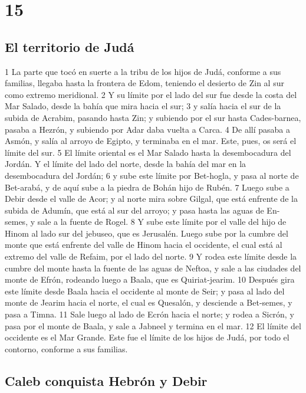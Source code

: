 \chapter{15}

\section*{El territorio de Judá}

1 La parte que tocó en suerte a la tribu de los hijos de Judá, conforme a sus familias, llegaba hasta la frontera de Edom, teniendo el desierto de Zin al sur como extremo meridional.
2 Y su límite por el lado del sur fue desde la costa del Mar Salado, desde la bahía que mira hacia el sur;
3 y salía hacia el sur de la subida de Acrabim, pasando hasta Zin; y subiendo por el sur hasta Cades-barnea, pasaba a Hezrón, y subiendo por Adar daba vuelta a Carca.
4 De allí pasaba a Asmón, y salía al arroyo de Egipto, y terminaba en el mar. Este, pues, os será el límite del sur.
5 El límite oriental es el Mar Salado hasta la desembocadura del Jordán. Y el límite del lado del norte, desde la bahía del mar en la desembocadura del Jordán;
6 y sube este límite por Bet-hogla, y pasa al norte de Bet-arabá, y de aquí sube a la piedra de Bohán hijo de Rubén.
7 Luego sube a Debir desde el valle de Acor; y al norte mira sobre Gilgal, que está enfrente de la subida de Adumín, que está al sur del arroyo; y pasa hasta las aguas de En-semes, y sale a la fuente de Rogel.
8 Y sube este límite por el valle del hijo de Hinom al lado sur del jebuseo, que es Jerusalén. Luego sube por la cumbre del monte que está enfrente del valle de Hinom hacia el occidente, el cual está al extremo del valle de Refaim, por el lado del norte.
9 Y rodea este límite desde la cumbre del monte hasta la fuente de las aguas de Neftoa, y sale a las ciudades del monte de Efrón, rodeando luego a Baala, que es Quiriat-jearim.
10 Después gira este límite desde Baala hacia el occidente al monte de Seir; y pasa al lado del monte de Jearim hacia el norte, el cual es Quesalón, y desciende a Bet-semes, y pasa a Timna.
11 Sale luego al lado de Ecrón hacia el norte; y rodea a Sicrón, y pasa por el monte de Baala, y sale a Jabneel y termina en el mar.
12 El límite del occidente es el Mar Grande. Este fue el límite de los hijos de Judá, por todo el contorno, conforme a sus familias.
\section*{Caleb conquista Hebrón y Debir }

